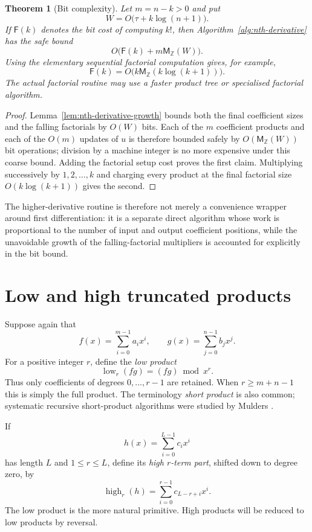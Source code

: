\documentclass[11pt]{book}
\newtheorem{theorem}{Theorem}[section]
\theoremstyle{definition}
\newcommand{\ZZ}{\mathbb Z}
\newcommand{\MZ}{\mathsf M_{\ZZ}}
\begin{document}
\begin{theorem}[Bit complexity]\label{thm:nth-derivative-bit}
Let $m=n-k>0$ and put
\[
 W=O\bigl(\tau+k\log(n+1)\bigr).
\]
If $\mathsf F(k)$ denotes the bit cost of computing $k!$, then
Algorithm~\ref{alg:nth-derivative} has the safe bound
\[
 O\bigl(\mathsf F(k)+m\MZ(W)\bigr).
\]
Using the elementary sequential factorial computation gives, for example,
\[
 \mathsf F(k)=O\bigl(k\MZ(k\log(k+1))\bigr).
\]
The actual factorial routine may use a faster product tree or specialised
factorial algorithm.
\end{theorem}

\begin{proof}
Lemma~\ref{lem:nth-derivative-growth} bounds both the final coefficient sizes
and the falling factorials by $O(W)$ bits.  Each of the $m$ coefficient
products and each of the $O(m)$ updates of $u$ is therefore bounded safely by
$O(\MZ(W))$ bit operations; division by a machine integer is no more expensive
under this coarse bound.  Adding the factorial setup cost proves the first
claim.  Multiplying successively by $1,2,\ldots,k$ and charging every product
at the final factorial size $O(k\log(k+1))$ gives the second.
\end{proof}

The higher-derivative routine is therefore not merely a convenience wrapper
around first differentiation: it is a separate direct algorithm whose work is
proportional to the number of input and output coefficient positions, while
the unavoidable growth of the falling-factorial multipliers is accounted for
explicitly in the bit bound.

\section{Low and high truncated products}

Suppose again that
\[
 f(x)=\sum_{i=0}^{m-1}a_ix^i,
 \qquad
 g(x)=\sum_{j=0}^{n-1}b_jx^j.
\]
For a positive integer $r$, define the \emph{low product}
\[
 \operatorname{low}_r(fg)=(fg)\bmod x^r.
\]
Thus only coefficients of degrees $0,\ldots,r-1$ are retained.  When
$r\geq m+n-1$ this is simply the full product.  The terminology \emph{short
product} is also common; systematic recursive short-product algorithms were
studied by Mulders \cite{Mulders2000}.

If
\[
 h(x)=\sum_{i=0}^{L-1}c_ix^i
\]
has length $L$ and $1\leq r\leq L$, define its \emph{high $r$-term part},
shifted down to degree zero, by
\[
 \operatorname{high}_r(h)=\sum_{i=0}^{r-1}c_{L-r+i}x^i.
\]
The low product is the more natural primitive.  High products will be reduced
to low products by reversal.
\end{document}
